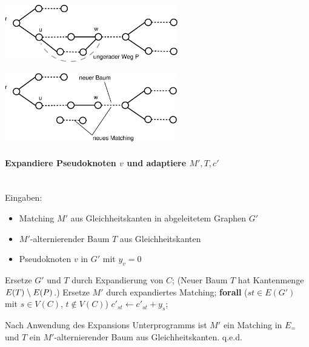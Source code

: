 \vspace{4mm}

\includegraphics[height=2.5cm]{bilder/5-3Expand3}

\vspace{4mm}

\includegraphics[height=3cm]{bilder/5-3Expand4}

\paragraph{Expandiere Pseudoknoten $v$ und adaptiere $M', T,c'$} \mbox{}\\
Eingaben:
\begin{itemize}
\item Matching $M'$ aus Gleichheitskanten in abgeleitetem Graphen $G'$
\item $M'$-alternierender Baum $T$ aus Gleichheitskanten
\item Pseudoknoten $v$ in $G'$ mit $y_v = 0$
\end{itemize}

\begin{algorithmic}
\STATE Ersetze $G'$ und $T$ durch Expandierung von $C$;
\STATE (Neuer Baum $T$ hat Kantenmenge $E(T) \;\backslash\; E(P)$.)
\STATE Ersetze $M'$ durch expandiertes Matching;
\STATE \textbf{forall} ($s t \in E(G')$ mit $s \in V(C)$, $t \not \in
V(C)$) $c'_{s t} \leftarrow c'_{s t} + y_s$;

\end{algorithmic}

\begin{lemma}
Nach Anwendung des Expansions Unterprogramms ist $M'$ ein Matching in
$E_{=}$ und $T$ ein $M'$-alternierender Baum aus Gleichheitskanten. q.e.d.
\end{lemma}

